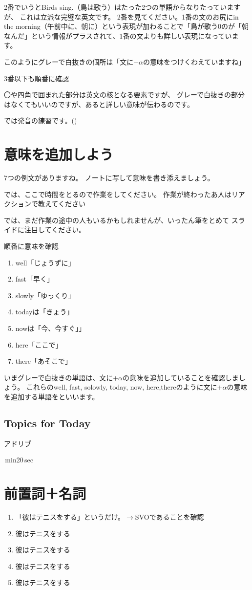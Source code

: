 \documentclass[book,jafontscale=0.9247]{jlreq}
\newcommand{\mySagyo}{%
\par%
\bigskip
では、ここで時間をとるので作業をしてください。
作業が終わったあ人はリアクションで教えてください\par%
\begin{minipage}[t]{.98\textwidth}
\mbox{}\hrulefill\mbox{}\par%
\mbox{}\hfill{}\raisebox{-.5\height}{作業}\hfill\mbox{}\par%
\mbox{}\hrulefill\mbox{}
\end{minipage}%
\par%
\bigskip%
では、まだ作業の途中の人もいるかもしれませんが、いったん筆をとめて
スライドに注目してください。%
\par%
\bigskip
}
\begin{document}
2番でいうとBirds sing.（鳥は歌う）はたった2つの単語からなりたっていますが、
これは立派な完璧な英文です。
2番を見てください。1番の文のお尻にin the morning（午前中に、朝に）という表現が加わることで「鳥が歌う0のが「朝なんだ」という情報がプラスされて、1番の文よりも詳しい表現になっています。

このようにグレーで白抜きの個所は「文に$+\alpha$の意味をつけくわえていますね」

3番以下も順番に確認

〇や四角で囲まれた部分は英文の核となる要素ですが、
グレーで白抜きの部分はなくてもいいのですが、あると詳しい意味が伝わるのです。

では発音の練習です。()

\section{意味を追加しよう}

7つの例文がありますね。
ノートに写して意味を書き添えましょう。

\mySagyo

順番に意味を確認
\begin{enumerate}
 \item well「じょうずに」
 \item fast「早く」
 \item slowly「ゆっくり」
 \item todayは「きょう」
 \item nowは「今、今すぐ」」
 \item here「ここで」
 \item there「あそこで」
\end{enumerate}

いまグレーで白抜きの単語は、文に$+\alpha$の意味を追加していることを確認しましょう。
これらのwell, fast, solowly, today, now, here,thereのように文に$+\alpha$の意味を追加する単語をといいます。

\subsection{Topics for Today}
アドリブ

\,min20\,sec

\section{前置詞＋名詞}

\begin{enumerate}
 \item 「彼はテニスをする」というだけ。$\rightarrow$SVOであることを確認
 \item 彼はテニスをする
 \item 彼はテニスをする
 \item 彼はテニスをする
 \item 彼はテニスをする
\end{enumerate}
\end{document}
